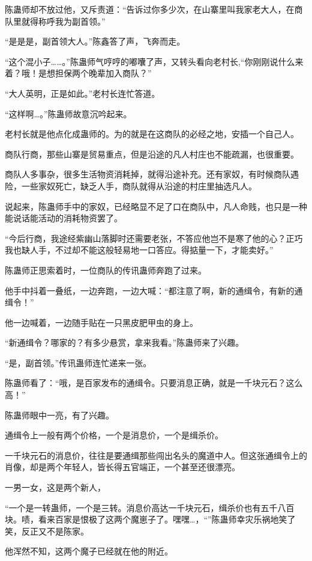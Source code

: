 \begin{this_body}
陈蛊师却不放过他，又斥责道：“告诉过你多少次，在山寨里叫我家老大人，在商队里就得称呼我为副首领。”

“是是是，副首领大人。”陈鑫答了声，飞奔而走。

“这个混小子……。”陈蛊师气哼哼的嘟囔了声，又转头看向老村长,“你刚刚说什么来着？哦！是想担保两个晚辈加入商队？”

“大人英明，正是如此。”老村长连忙答道。

“这样啊…。”陈蛊师故意沉吟起来。

老村长就是他点化成蛊师的。为的就是在这商队的必经之地，安插一个自己人。

商队行商，那些山寨是贸易重点，但是沿途的凡人村庄也不能疏漏，也很重要。

商队人多事杂，很多生活物资消耗掉，就得沿途补充。还有家奴，有时候商队遇险，一些家奴死亡，缺乏人手，商队就得从沿途的村庄里抽选凡人。

说起来，陈蛊师手中的家奴，已经略显不足了口在商队中，凡人命贱，也只是一种能说话能活动的消耗物资罢了。

“今后行商，我途经紫幽山落脚时还需要老张，不答应他岂不是寒了他的心？正巧我也缺人手，不过却不能这般轻易地一口答应。得掂量一下，才能卖好。”

陈蛊师正思索着时，一位商队的传讯蛊师奔跑了过来。

他手中抖着一叠纸，一边奔跑，一边大喊：“都注意了啊，新的通缉令，有新的通缉令！”

他一边喊着，一边随手贴在一只黑皮肥甲虫的身上。

“新通缉令？哪家的？有多少悬赏，拿来我看。”陈蛊师来了兴趣。

“是，副首领。”传讯蛊师连忙递来一张。

陈蛊师看了：“哦，是百家发布的通缉令。只要消息正确，就是一千块元石？这么高！”

陈蛊师眼中一亮，有了兴趣。

通缉令上一般有两个价格，一个是消息价，一个是缉杀价。

一千块元石的消息价，往往是要通缉那些闯出名头的魔道中人。但这张通缉令上的肖像，却是两个年轻人，皆长得五官端正，一个甚至还很漂亮。

一男一女，这是两个新人，

“一个是一转蛊师，一个是三转。消息价高达一千块元石，缉杀价也有五千八百块。啧，看来百家是恨极了这两个魔崽子了。嘿嘿…，“”陈蛊师幸灾乐祸地笑了笑，反正又不是陈家。

他浑然不知，这两个魔子已经就在他的附近。


\end{this_body}
